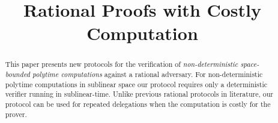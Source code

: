 \documentclass{llncs}
\title{Rational Proofs with Costly Computation}
\author{}
\institute{}
\date{}
\begin{document}
\maketitle


\newcommand{\protOne}{\pi^{L_2}_{1}}
\newcommand{\protTwo}{\pi_{2}}
\newcommand{\rewGap}{\Delta}
\newcommand{\STEP}{\function{STEP}}

\newcommand{\disTransc}{\tilde{\Tau}}


\begin{abstract}
This paper presents new protocols for the verification of {\em non-deterministic space-bounded polytime computations} against a rational adversary.
For non-deterministic polytime computations in sublinear space our protocol requires only a deterministic verifier  running in sublinear-time.
Unlike previous rational protocols in literature, our protocol can be used for repeated delegations when the computation is costly for the prover. %
\end{abstract}


\begin{comment}
\begin{abstract}
This paper presents new protocols for the verification of {\em non-deterministic space-bounded polytime computations} against a rational adversary. More specifically consider a language $L \in \NTISP(T(n), S(n))$, i.e. a language recognized by a non-deterministic Turing Machine $M_L$ which runs in time $T(n)$ and space $S(n)$. 
We construct a protocol where a rational prover can
convince the verifier that $x \in L$ with the following properties: 
\begin{itemize}
\item The verifier runs in time $O(S(n) \log n)$;
\item The protocol terminates in $O(\log n)$ rounds and communication complexity $O(S(n) \log n)$;
\item The prover simply runs $M_L(x)$ and stores all the intermediate configurations (i.e. requires space $O(S(n) T(n))$.
\end{itemize}
Note that for polytime computations in sublinear space this gives a protocol in which the verifier is sublinear-time. 
\end{abstract}
\end{comment}
\end{document}
